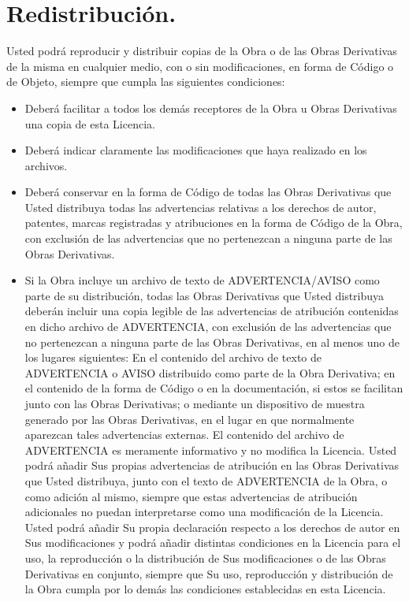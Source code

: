 \section{Redistribución.}Usted podrá reproducir y distribuir copias de la Obra o de las Obras Derivativas de la misma en cualquier medio, con o sin modificaciones, en forma de Código o de Objeto, siempre que cumpla las siguientes condiciones:
\begin{itemize}
    \item Deberá facilitar a todos los demás receptores de la Obra u Obras Derivativas una copia de esta Licencia.
    \item Deberá indicar claramente las modificaciones que haya realizado en los archivos.
    \item Deberá conservar en la forma de Código de todas las Obras Derivativas que Usted distribuya todas las advertencias relativas a los derechos de autor, patentes, marcas registradas y atribuciones en la forma de Código de la Obra, con exclusión de las advertencias que no pertenezcan a ninguna parte de las Obras Derivativas.
    \item Si la Obra incluye un archivo de texto de ADVERTENCIA/AVISO como parte de su distribución, todas las Obras Derivativas que Usted distribuya deberán incluir una copia legible de las advertencias de atribución contenidas en dicho archivo de ADVERTENCIA, con exclusión de las advertencias que no pertenezcan a ninguna parte de las Obras Derivativas, en al menos uno de los lugares siguientes: En el contenido del archivo de texto de ADVERTENCIA o AVISO distribuido como parte de la Obra Derivativa; en el contenido de la forma de Código o en la documentación, si estos se facilitan junto con las Obras Derivativas; o mediante un dispositivo de muestra generado por las Obras Derivativas, en el lugar en que normalmente aparezcan tales advertencias externas. El contenido del archivo de ADVERTENCIA es meramente informativo y no modifica la Licencia. Usted podrá añadir Sus propias advertencias de atribución en las Obras Derivativas que Usted distribuya, junto con el texto de ADVERTENCIA de la Obra, o como adición al mismo, siempre que estas advertencias de atribución adicionales no puedan interpretarse como una modificación de la Licencia. Usted podrá añadir Su propia declaración respecto a los derechos de autor en Sus modificaciones y podrá añadir distintas condiciones en la Licencia para el uso, la reproducción o la distribución de Sus modificaciones o de las Obras Derivativas en conjunto, siempre que Su uso, reproducción y distribución de la Obra cumpla por lo demás las condiciones establecidas en esta Licencia.
\end{itemize}
